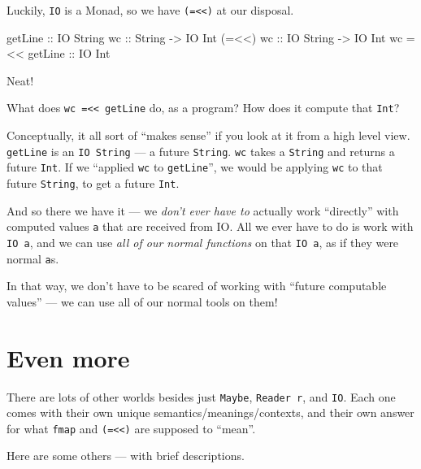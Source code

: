 \documentclass[]{article}
\newenvironment{Shaded}{}{}
\newcommand{\DataTypeTok}[1]{\textcolor[rgb]{0.56,0.13,0.00}{{#1}}}
\newcommand{\OtherTok}[1]{\textcolor[rgb]{0.00,0.44,0.13}{{#1}}}
\newcommand{\FunctionTok}[1]{\textcolor[rgb]{0.02,0.16,0.49}{{#1}}}
\newcommand{\NormalTok}[1]{{#1}}
\begin{document}
Luckily, \texttt{IO} is a Monad, so we have
\texttt{(=\textless{}\textless{})} at our disposal.

\begin{Shaded}
\begin{Highlighting}[]
\NormalTok{getLine}\OtherTok{        ::} \DataTypeTok{IO} \DataTypeTok{String}
\OtherTok{wc             ::} \DataTypeTok{String} \OtherTok{->} \DataTypeTok{IO} \DataTypeTok{Int}
\NormalTok{(}\FunctionTok{=<<}\NormalTok{)}\OtherTok{ wc       ::} \DataTypeTok{IO} \DataTypeTok{String} \OtherTok{->} \DataTypeTok{IO} \DataTypeTok{Int}
\NormalTok{wc }\FunctionTok{=<<}\OtherTok{ getLine ::} \DataTypeTok{IO} \DataTypeTok{Int}
\end{Highlighting}
\end{Shaded}

Neat!

What does \texttt{wc\ =\textless{}\textless{}\ getLine} do, as a
program? How does it compute that \texttt{Int}?

Conceptually, it all sort of ``makes sense'' if you look at it from a
high level view. \texttt{getLine} is an \texttt{IO\ String} --- a future
\texttt{String}. \texttt{wc} takes a \texttt{String} and returns a
future \texttt{Int}. If we ``applied \texttt{wc} to \texttt{getLine}'',
we would be applying \texttt{wc} to that future \texttt{String}, to get
a future \texttt{Int}.

And so there we have it --- we \emph{don't ever have to} actually work
``directly'' with computed values \texttt{a} that are received from IO.
All we ever have to do is work with \texttt{IO\ a}, and we can use
\emph{all of our normal functions} on that \texttt{IO\ a}, as if they
were normal \texttt{a}s.

In that way, we don't have to be scared of working with ``future
computable values'' --- we can use all of our normal tools on them!

\section{Even more}\label{even-more}

There are lots of other worlds besides just \texttt{Maybe},
\texttt{Reader\ r}, and \texttt{IO}. Each one comes with their own
unique semantics/meanings/contexts, and their own answer for what
\texttt{fmap} and \texttt{(=\textless{}\textless{})} are supposed to
``mean''.

Here are some others --- with brief descriptions.
\end{document}
